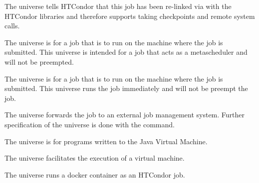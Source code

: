 \begin{description}
The  universe tells HTCondor that this job has been
re-linked via  with the HTCondor libraries and therefore
supports taking checkpoints and remote system calls.

The  universe is for a job that is to run on the
machine where the job is submitted.
This universe is intended for a job that acts as a metascheduler
and will not be preempted.

The  universe is for a job that is to run on the
machine where the job is submitted.
This universe runs the job immediately and will not be preempt the job.

The  universe forwards the job to an external job
management system.
Further specification of the  universe is done with the
 command.

The  universe is for programs written to the Java Virtual Machine.

The  universe facilitates the execution of a virtual
machine.

The  universe runs a docker container as an HTCondor job.

\end{description} 



